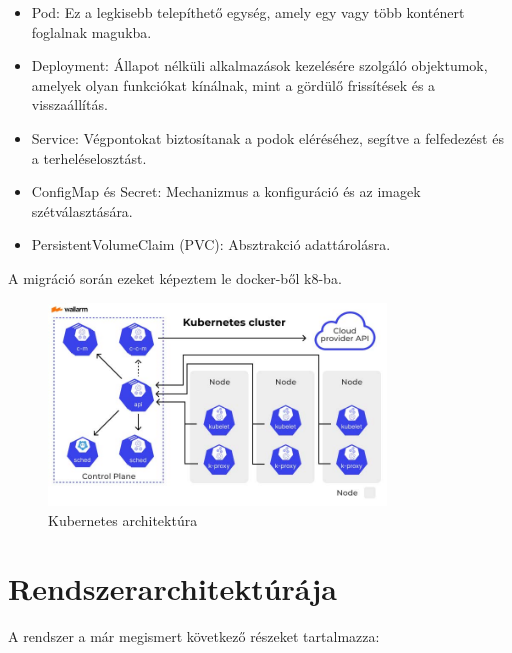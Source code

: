 \begin{itemize}
    \item Pod: Ez a legkisebb telepíthető egység, amely egy vagy több konténert foglalnak magukba.
    
    \item Deployment: Állapot nélküli alkalmazások kezelésére szolgáló objektumok, amelyek olyan funkciókat kínálnak, mint a gördülő frissítések és a visszaállítás.
    
    \item Service: Végpontokat biztosítanak a podok eléréséhez, segítve a felfedezést és a terheléselosztást.
    
    \item ConfigMap és Secret: Mechanizmus a konfiguráció és az imagek szétválasztására.
    
    \item PersistentVolumeClaim (PVC): Absztrakció adattárolásra.
\end{itemize}

A migráció során ezeket képeztem le docker-ből k8-ba.

\begin{figure}[!ht]
    \centering
    \includegraphics[width=0.8\textwidth, keepaspectratio]{figures/components-of-kubernetes.jpeg}
    \caption{Kubernetes architektúra \cite{wallarm_kubernetes_cluster}} 
\end{figure}

\section{Rendszerarchitektúrája}

A rendszer a már megismert következő részeket tartalmazza:

